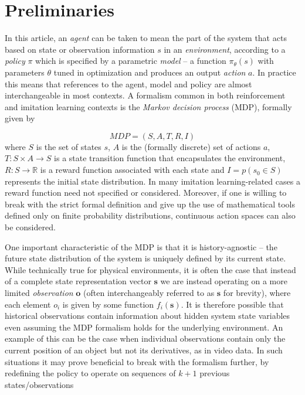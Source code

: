 \documentclass{article}
\begin{document}
\section{Preliminaries}
\label{sec:prelim}

In this article, an \emph{agent} can be taken to mean the part of the system that acts based on state or observation information $s$ in an \emph{environment}, according to a \emph{policy} $\pi$ which is specified by a parametric \emph{model} -- a function $\pi_{\theta}(s)$ with parameters $\theta$ tuned in optimization and produces an output \emph{action} $a$. In practice this means that references to the agent, model and policy are almost interchangeable in most contexts. A formalism common in both reinforcement and imitation learning contexts is the \emph{Markov decision process} (MDP), formally given by \citep{attia2018global}

\begin{equation}
	MDP = (S,A,T,R,I)
\end{equation}
where $S$ is the set of states $s$, $A$ is the (formally discrete) set of actions $a$, $T:S \times A \rightarrow S$ is a state transition function that encapsulates the environment, $R:S \rightarrow \mathbb{R}$ is a reward function associated with each state and $I = p\left(s_0 \in S\right)$ represents the initial state distribution. In many imitation learning-related cases a reward function need not specified or considered. Moreover, if one is willing to break with the strict formal definition and give up the use of mathematical tools defined only on finite probability distributions, continuous action spaces can also be considered.

One important characteristic of the MDP is that it is history-agnostic -- the future state distribution of the system is uniquely defined by its current state. While technically true for physical environments, it is often the case that instead of a complete state representation vector $\mathbf{s}$ we are instead operating on a more limited \emph{observation} $\mathbf{o}$ (often interchangeably referred to as $\mathbf{s}$ for brevity), where each element $o_i$ is given by some function $f_i(\mathbf{s})$. It is therefore possible that historical observations contain information about hidden system state variables even assuming the MDP formalism holds for the underlying environment. An example of this can be the case when individual observations contain only the current position of an object but not its derivatives, as in video data. In such situations it may prove beneficial to break with the formalism further, by redefining the policy to operate on sequences of $k+1$ previous states/observations
\end{document}
